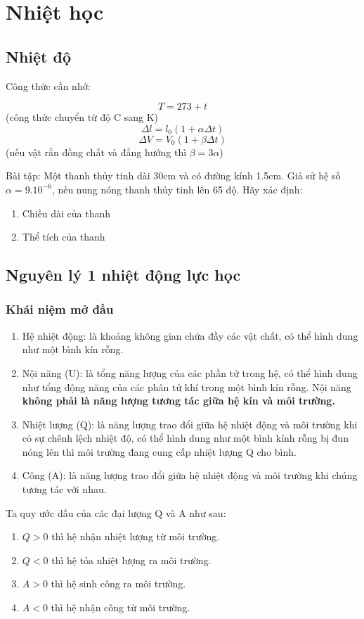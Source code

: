 \chapter{Nhiệt học}
\section{Nhiệt độ}
Công thức cần nhớ:
\begin{tcolorbox}
    $$T=273+t$$ (công thức chuyển từ độ C sang K)
    $$\Delta l=l_{0}(1+\alpha \Delta t)$$
    $$\Delta V=V_{0}(1+\beta \Delta t)$$
(nếu vật rắn đồng chất và đẳng hướng thì $\beta=3\alpha$)
\end{tcolorbox}
Bài tập: Một thanh thủy tinh dài 30cm và có đường kính 1.5cm. Giả sử hệ số $\alpha=9.10^{-6}$, nếu nung nóng thanh thủy tinh lên 65 độ. Hãy xác định:
\begin{enumerate}
    \item Chiều dài của thanh
    \item Thể tích của thanh
\end{enumerate}
\section{Nguyên lý 1 nhiệt động lực học}
\subsection{Khái niệm mở đầu}
\begin{enumerate}
    \item Hệ nhiệt động: là khoảng không gian chứa đầy các vật chất, có thể hình dung như một bình kín rỗng.
    \item Nội năng (U): là tổng năng lượng của các phần tử trong hệ, có thể hình dung như tổng động năng của các phân tử khí trong một bình kín rỗng. Nội năng \textbf{không phải là năng lượng tương tác giữa hệ kín và môi trường.}
    \item Nhiệt lượng (Q): là năng lượng trao đổi giữa hệ nhiệt động và môi trường khi có sự chênh lệch nhiệt độ, có thể hình dung như một bình kính rỗng bị đun nóng lên thì môi trường đang cung cấp nhiệt lượng Q cho bình.
    \item Công (A): là năng lượng trao đổi giữa hệ nhiệt động và môi trường khi chúng tương tác với nhau.
\end{enumerate}
Ta quy ước dấu của các đại lượng Q và A như sau:
\begin{enumerate}
    \item $Q>0$ thì hệ nhận nhiệt lượng từ môi trường.
    \item $Q<0$ thì hệ tỏa nhiệt lượng ra môi trường.
    \item $A>0$ thì hệ sinh công ra môi trường.
    \item $A<0$ thì hệ nhận công từ môi trường.
\end{enumerate}
